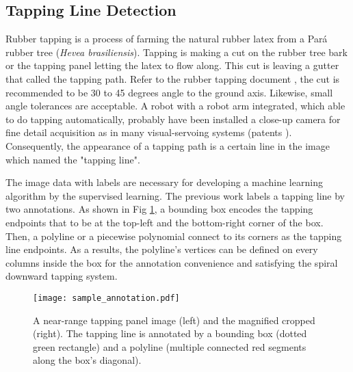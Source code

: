 \documentclass[default,pdflatex,iicol]{sn-jnl}%
\begin{document}
\subsection{Tapping Line Detection}
Rubber tapping is a process of farming the natural rubber latex from a Pará rubber tree (\textit{Hevea brasiliensis}). Tapping is making a cut on the rubber tree bark or the tapping panel letting the latex to flow along. This cut is leaving a gutter that called the tapping path. Refer to the rubber tapping document \cite{abraham1992tapping}, the cut is recommended to be 30 to 45 degrees angle to the ground axis. Likewise, small angle tolerances are acceptable. A robot with a robot arm integrated, which able to do tapping automatically, probably have been installed a close-up camera for fine detail acquisition as in many visual-servoing systems (patents \cite{patent1, patent2, patent3}). Consequently, the appearance of a tapping path is a certain line in the image which named the "tapping line".

The image data with labels are necessary for developing a machine learning algorithm by the supervised learning. The previous work \cite{Wongtanawijit_2021} labels a tapping line by two annotations. As shown in Fig \ref{fig-sampleannotation}, a bounding box encodes the tapping endpoints that to be at the top-left and the bottom-right corner of the box. Then, a polyline or a piecewise polynomial connect to its corners as the tapping line endpoints. As a results, the polyline's vertices can be defined on every columns inside the box for the annotation convenience and satisfying the spiral downward tapping system.

\begin{figure}[h]%
\centering
\texttt{[image: sample\_annotation.pdf]}
\caption{A near-range tapping panel image (left) and the magnified cropped (right). The tapping line is annotated by a bounding box (dotted green rectangle) and a polyline (multiple connected red segments along the box's diagonal).}\label{fig-sampleannotation}
\end{figure}
\end{document}
